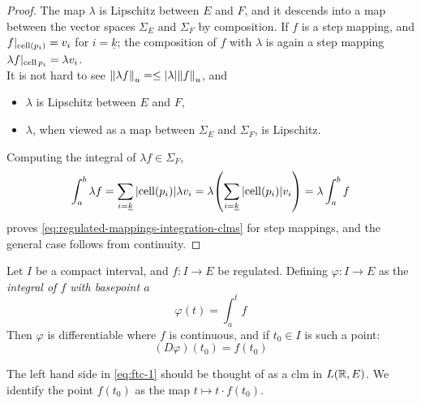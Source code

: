 \documentclass[../main-v2-manifolds.tex]{subfiles}
\begin{document}
\begin{proof}
    The map $\lambda$ is Lipschitz between $E$ and $F$, and it descends into a map between the vector spaces $\Sigma_E$ and $\Sigma_F$ by composition. If $f$ is a step mapping, and $f\vert_{\operatorname{cell}(p_i)} = v_i$ for $i = \underline{k}$; the composition of $f$ with $\lambda$ is again a step mapping $\lambda f\vert_{\operatorname{cell}{p_i}} = \lambda v_i$.\\
    
    It is not hard to see $\norm{\lambda f}_u = \leq \vert {\lambda} \vert\norm{f}_u$, and 
    \begin{itemize}
        \item $\lambda$ is Lipschitz between $E$ and $F$,
        \item $\lambda$, when viewed as a map between $\Sigma_E$ and $\Sigma_F$, is Lipschitz.
    \end{itemize}
    Computing the integral of $\lambda f\in \Sigma_F$,
    \[
        \int_a^b \lambda f = \sum_{i=\underline{k}}\vert {\operatorname{cell}(p_i)} \vert\lambda v_i = \lambda\qty(\sum_{i=\underline{k}}\vert {\operatorname{cell}(p_i)} \vert v_i) = \lambda \int_a^b f
    \]
    proves \cref{eq:regulated-mappings-integration-clms} for step mappings, and the general case follows from continuity.
\end{proof}
\begin{wts}
    Let $I$ be a compact interval, and $f: I\to E$ be regulated. Defining $\varphi:I \to E$ as the \emph{integral of $f$ with basepoint $a$}
    \begin{equation}\label{eq:ftc-phi-def}
        \varphi(t) = \int_a^t f
    \end{equation}
    Then $\varphi$ is differentiable where $f$ is continuous, and if $t_0\in I$ is such a point:
    \begin{equation}\label{eq:ftc-1}
        (D\varphi)(t_0) = f(t_0)
    \end{equation}
\end{wts}
\begin{remark}[Identifications]
    The left hand side in \cref{eq:ftc-1} should be thought of as a clm in $L(\mathbb{R}, E)$. We identify the point $f(t_0)$ as the map $t\mapsto t\cdot f(t_0)$.
\end{remark}

\end{document}
